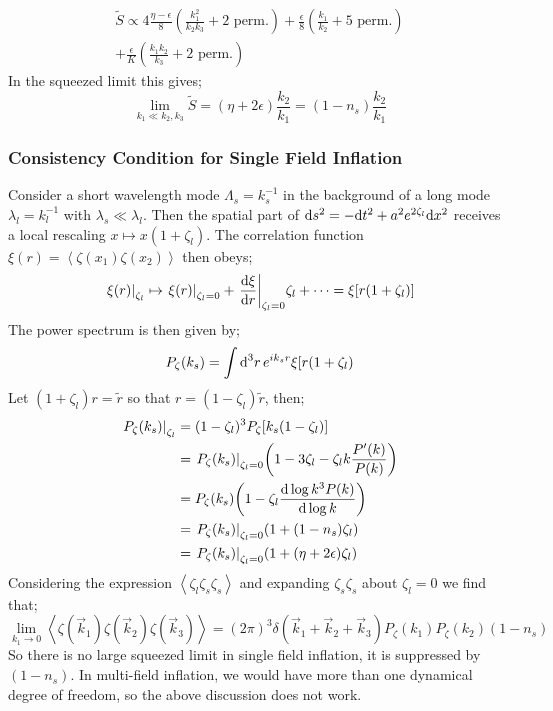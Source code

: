 \begin{multline*}
\tilde{S} \propto 4\frac{\eta - \epsilon}{8}\left(\frac{k_1^2}{k_2 k_3} + \text{2 perm.}\right) + \frac{\epsilon}{8}\left(\frac{k_1}{k_2} + \text{5 perm.}\right) \\ + \frac{\epsilon}{K}\left(\frac{k_1 k_2}{k_3} + \text{2 perm.}\right)
\end{multline*}
In the squeezed limit this gives;
\begin{equation*}
\lim_{k_1 \ll k_2, k_3}\tilde{S} = (\eta + 2\epsilon)\frac{k_2}{k_1} = (1 - n_s)\frac{k_2}{k_1}
\end{equation*}
\subsubsection{Consistency Condition for Single Field Inflation}
Consider a short wavelength mode $\Lambda_s = k_s^{-1}$ in the background of a long mode $\lambda_l = k_l^{-1}$ with $\lambda_s \ll \lambda_l$. Then the spatial part of $\text{d} s^2 = -\text{d} t^2 + a^2 e^{2\zeta_l} \text{d} x^2$ receives a local rescaling $x \mapsto x(1 + \zeta_l)$. The correlation function $\xi(r) = \left< \zeta(x_1)\zeta(x_2) \right>$ then obeys;
\begin{equation*}
\left.\xi(r)\right|_{\zeta_l} \mapsto \left.\xi(r)\right|_{\zeta_l = 0} + \left.\frac{\ud \xi}{\ud r}\right|_{\zeta_l = 0}\zeta_l + \cdots = \xi[r(1 + \zeta_l)]
\end{equation*}
The power spectrum is then given by;
\begin{equation*}
P_\zeta(k_s) = \int{\text{d}^3 r \,e^{ik_s r}\xi[r(1 + \zeta_l)}
\end{equation*}
Let $(1 + \zeta_l)r = \tilde{r}$ so that $r = (1 - \zeta_l) \tilde{r}$, then;
\begin{align*}
\left.P_{\zeta}(k_s)\right|_{\zeta_l} &= (1 - \zeta_l)^3 P_\zeta[k_s(1 - \zeta_l)] \\
&= \left.P_\zeta(k_s)\right|_{\zeta_l = 0}\left(1 - 3 \zeta_l - \zeta_l k \frac{P\pr(k)}{P(k)}\right) \\
&= P_{\zeta}(k_s)\left(1 - \zeta_l \frac{\ud \log k^3 P(k)}{\ud \log k}\right) \\
&= \left.P_{\zeta}(k_s)\right|_{\zeta_l = 0}\left(1 + (1 - n_s)\zeta_l\right) \\
&= \left.P_{\zeta}(k_s)\right|_{\zeta_l = 0}\left(1 + (\eta + 2\epsilon)\zeta_l\right)
\end{align*}
Considering the expression $\left< \zeta_l \zeta_s \zeta_s \right>$ and expanding $\zeta_s \zeta_s$ about $\zeta_l = 0$ we find that;
\begin{equation}
\lim_{k_1 \rightarrow 0}\left< \zeta(\vec{k}_1)\zeta(\vec{k}_2)\zeta(\vec{k}_3) \right> = (2\pi)^3 \delta(\vec{k}_1 + \vec{k}_2 + \vec{k}_3) P_{\zeta}(k_1) P_{\zeta}(k_2)(1 - n_s)
\end{equation}
So there is no large squeezed limit in single field inflation, it is suppressed by $(1 - n_s)$. In multi-field inflation, we would have more than one dynamical degree of freedom, so the above discussion does not work.

